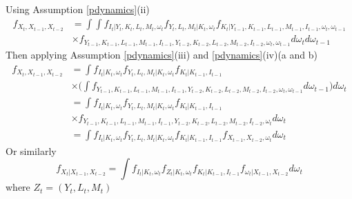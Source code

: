 \documentclass{article}
\begin{document}
Using Assumption \eqref{pdynamics}(ii)
\begin{equation*}
\begin{split}
f_{X_{t},X_{t-1}, X_{t-2}}&=\int\int f_{I_{t}|Y_{t}, K_{t}, L_{t}, M_{t}, \omega_{t}}f_{Y_{t}, L_{t}, M_{t}|K_{t}, \omega_{t}}f_{K_{t}|Y_{t-1}, K_{t-1}, L_{t-1}, M_{t-1}, I_{t-1}, \omega_{t}, \omega_{t-1}}\\
&\times f_{Y_{t-1}, K_{t-1}, L_{t-1}, M_{t-1}, I_{t-1}, Y_{t-2}, K_{t-2}, L_{t-2}, M_{t-2}, I_{t-2}, \omega_{t}, \omega_{t-1}}d\omega_{t}d\omega_{t-1}
\end{split}
\end{equation*}
Then applying Assumption \eqref{pdynamics}(iii) and \eqref{pdynamics}(iv)(a and b)
\begin{equation*}
\begin{split}
f_{X_{t},X_{t-1}, X_{t-2}}&=\int f_{I_{t}|K_{t}, \omega_{t}}f_{Y_{t}, L_{t}, M_{t}|K_{t}, \omega_{t}}f_{K_{t}|K_{t-1}, I_{t-1}}\\
&\times \Bigg(\int f_{Y_{t-1}, K_{t-1}, L_{t-1}, M_{t-1}, I_{t-1}, Y_{t-2}, K_{t-2}, L_{t-2}, M_{t-2}, I_{t-2}, \omega_{t}, \omega_{t-1}}d\omega_{t-1}\Bigg) d\omega_{t}\\
&=\int f_{I_{t}|K_{t}, \omega_{t}}f_{Y_{t}, L_{t}, M_{t}|K_{t}, \omega_{t}}f_{K_{t}|K_{t-1}, I_{t-1}}\\
&\times f_{Y_{t-1}, K_{t-1}, L_{t-1}, M_{t-1}, I_{t-1}, Y_{t-2}, K_{t-2}, L_{t-2}, M_{t-2}, I_{t-2}, \omega_{t}} d\omega_{t}\\
&=\int f_{I_{t}|K_{t}, \omega_{t}}f_{Y_{t}, L_{t}, M_{t}|K_{t}, \omega_{t}}f_{K_{t}|K_{t-1}, I_{t-1}}f_{X_{t-1}, X_{t-2}, \omega_{t}} d\omega_{t}
\end{split}
\end{equation*}
Or similarly
\begin{equation*}
f_{X_{t}|X_{t-1}, X_{t-2}}=\int f_{I_{t}|K_{t}, \omega_{t}}f_{Z_{t}|K_{t}, \omega_{t}}f_{K_{t}|K_{t-1}, I_{t-1}}f_{\omega_{t}|X_{t-1}, X_{t-2}} d\omega_{t}
\end{equation*}
where $Z_{t}=(Y_{t}, L_{t}, M_{t})$
\end{document}
